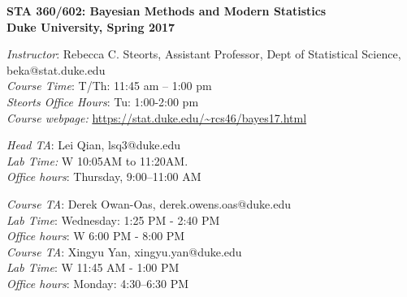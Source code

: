 \documentclass[11pt]{article}
\date{}
\begin{document}

\begin{center}
{\Large\bf STA 360/602: Bayesian Methods and Modern Statistics} \\

{\Large\bf Duke University, Spring 2017} \\
\end{center}

\emph{Instructor}: Rebecca C. Steorts,  Assistant Professor, Dept of Statistical Science, beka@stat.duke.edu\\
\emph{Course Time}: T/Th: 11:45 am -- 1:00 pm\\
\emph{Steorts Office Hours}: Tu: 1:00-2:00 pm \\
\emph{Course webpage:} \url{https://stat.duke.edu/~rcs46/bayes17.html} \\
\vspace*{1em}

\emph{Head TA}:  Lei Qian, lsq3@duke.edu\\
\emph{Lab Time:} W 10:05AM to 11:20AM.\\
\emph{Office hours}:  Thursday, 9:00--11:00 AM
\vspace*{1em}

\emph{Course TA}: Derek Owan-Oas, derek.owens.oas@duke.edu \\
\emph{Lab Time}: Wednesday: 1:25 PM - 2:40 PM \\
\emph{Office hours}: W 6:00 PM - 8:00 PM \\

\emph{Course TA}: Xingyu Yan, xingyu.yan@duke.edu \\
\emph{Lab Time}: W 11:45 AM - 1:00 PM\\
\emph{Office hours}: Monday: 4:30--6:30 PM  \\


\end{document}
